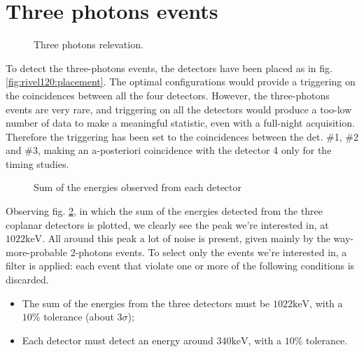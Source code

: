 \documentclass[11pt,a4 paper]{article}
\begin{document}
\section{Three photons events}

\begin{figure}[H]
    \centering
    { \label{fig:rivel120:placement}} \quad
    {}
    \caption{Three photons relevation.}
    \label{fig:rivel120}
\end{figure}
To detect the three-photons events, the detectors have been placed as in fig. \ref{fig:rivel120:placement}. The optimal configurations would provide a triggering on the coincidences between all the four detectors. However, the three-photons events are very rare, and triggering on all the detectors would produce a too-low number of data to make a meaningful statistic, even with a full-night acquisition. Therefore the triggering has been set to the coincidences between the det. \#1, \#2 and \#3, making an a-posteriori coincidence with the detector 4 only for the timing studies.
\begin{figure}[H]
    \centering
    \caption{Sum of the energies observed from each detector}
    \label{fig:sum:3gamma}
\end{figure}
Observing fig. \ref{fig:sum:3gamma}, in which the sum of the energies detected from the three coplanar detectors is plotted, we clearly see the peak we're interested in, at $1022\si{\kilo\electronvolt}$. All around this peak a lot of noise is present, given mainly by the way-more-probable 2-photons events. To select only the events we're interested in, a filter is applied: each event that violate one or more of the following conditions is discarded.
\begin{itemize}[noitemsep]
    \item The sum of the energies from the three detectors must be $1022\si{\kilo\electronvolt}$, with a $10\%$ tolerance (about $3\sigma$);
    \item Each detector must detect an energy around $340\si{\kilo\electronvolt}$, with a $10\%$ tolerance.
\end{itemize}
\end{document}
